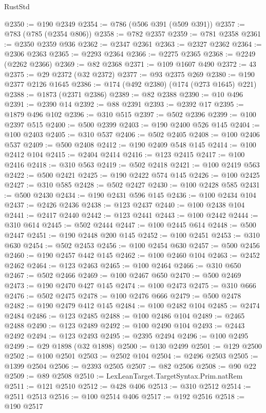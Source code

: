 \begin{lexlean}{RustStd}
\begin{coremodule}
{\begin{coremodule}
{{{{{{{{{{{{{{{{{{{{{{{{{{{{{{{{{{{{{{{{{{{{{{{{{{{{{{{@2350 := @190 @2349
@2354 := @786 (@506 @391 (@509 @391))
@2357 := @783 (@785 (@2354 @806))
@2358 := @782 @2357
@2359 := @781 @2358
@2361 := @2350 @2359 @936
@2362 := @2347 @2361
@2363 := @2327 @2362
@2364 := @2306 @2363
@2365 := @2293 @2364
@2366 := @2275 @2365
@2368 := @2249 (@2262 @2366)
@2369 := @82 @2368
@2371 := @109 @1607 @490
@2372 := 43
@2375 := @29 @2372 (@32 @2372)
@2377 := @93 @2375 @269
@2380 := @190 @2377 @2126 @1645
@2386 := @174 (@492 @2380) (@174 (@273 @1645) @221)
@2388 := @1873 (@2371 @2386)
@2389 := @82 @2388
@2390 := @10 @496
@2391 := @2390 @14
@2392 := @88 @2391
@2393 := @2392 @17
@2395 := @1879 @496 @102
@2396 := @310 @515
@2397 := @502 @2396
@2399 := @100 @2397 @515
@2400 := @500 @2399
@2403 := @190 @2400 @526 @145
@2404 := @100 @2403
@2405 := @310 @537
@2406 := @502 @2405
@2408 := @100 @2406 @537
@2409 := @500 @2408
@2412 := @190 @2409 @548 @145
@2414 := @100 @2412 @104
@2415 := @2404 @2414
@2416 := @123 @2415
@2417 := @100 @2416
@2418 := @310 @563
@2419 := @502 @2418
@2421 := @100 @2419 @563
@2422 := @500 @2421
@2425 := @190 @2422 @574 @145
@2426 := @100 @2425
@2427 := @310 @585
@2428 := @502 @2427
@2430 := @100 @2428 @585
@2431 := @500 @2430
@2434 := @190 @2431 @596 @145
@2436 := @100 @2434 @104
@2437 := @2426 @2436
@2438 := @123 @2437
@2440 := @100 @2438 @104
@2441 := @2417 @2440
@2442 := @123 @2441
@2443 := @100 @2442
@2444 := @310 @614
@2445 := @502 @2444
@2447 := @100 @2445 @614
@2448 := @500 @2447
@2451 := @190 @2448 @200 @145
@2452 := @100 @2451
@2453 := @310 @630
@2454 := @502 @2453
@2456 := @100 @2454 @630
@2457 := @500 @2456
@2460 := @190 @2457 @442 @145
@2462 := @100 @2460 @104
@2463 := @2452 @2462
@2464 := @123 @2463
@2465 := @100 @2464
@2466 := @310 @650
@2467 := @502 @2466
@2469 := @100 @2467 @650
@2470 := @500 @2469
@2473 := @190 @2470 @427 @145
@2474 := @100 @2473
@2475 := @310 @666
@2476 := @502 @2475
@2478 := @100 @2476 @666
@2479 := @500 @2478
@2482 := @190 @2479 @412 @145
@2484 := @100 @2482 @104
@2485 := @2474 @2484
@2486 := @123 @2485
@2488 := @100 @2486 @104
@2489 := @2465 @2488
@2490 := @123 @2489
@2492 := @100 @2490 @104
@2493 := @2443 @2492
@2494 := @123 @2493
@2495 := @2395 @2494
@2496 := @100 @2495
@2499 := @29 @1898 (@32 @1898)
@2500 := @130 @2499
@2501 := @129 @2500
@2502 := @100 @2501
@2503 := @2502 @104
@2504 := @2496 @2503
@2505 := @1399 @2504
@2506 := @2393 @2505
@2507 := @82 @2506
@2508 := @90 @22
@2509 := @89 @2508
@2510 := LexLeanTarget.TargetSyntax.Prim.natRem
@2511 := @121 @2510
@2512 := @428 @406
@2513 := @310 @2512
@2514 := @2511 @2513
@2516 := @100 @2514 @406
@2517 := @192 @2516
@2518 := @190 @2517
}}}}}}}}}}}}}}}}}}}}}}}}}}}}}}}}}}}}}}}}}}}}}}}}}}}}}}}
\end{coremodule}}
\end{coremodule}
\end{lexlean}
